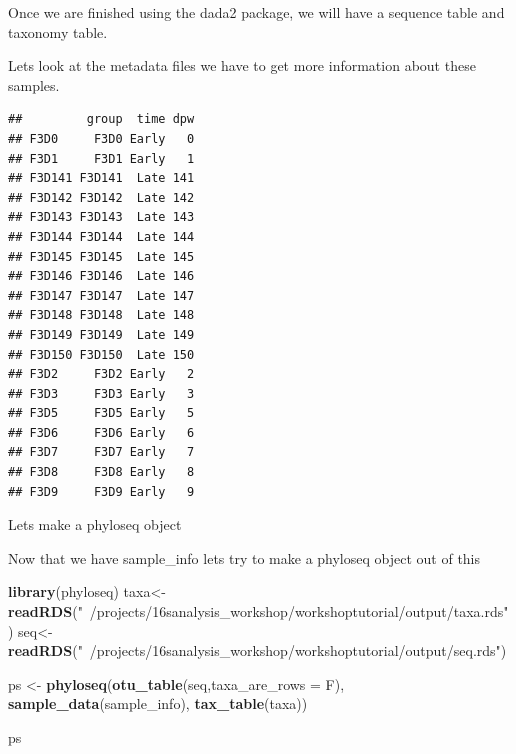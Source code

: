\documentclass[
]{book}
\newenvironment{Shaded}{\begin{snugshade}}{\end{snugshade}}
\newcommand{\CharTok}[1]{\textcolor[rgb]{0.31,0.60,0.02}{#1}}
\newcommand{\DataTypeTok}[1]{\textcolor[rgb]{0.13,0.29,0.53}{#1}}
\newcommand{\KeywordTok}[1]{\textcolor[rgb]{0.13,0.29,0.53}{\textbf{#1}}}
\newcommand{\NormalTok}[1]{#1}
\newcommand{\OperatorTok}[1]{\textcolor[rgb]{0.81,0.36,0.00}{\textbf{#1}}}
\newcommand{\StringTok}[1]{\textcolor[rgb]{0.31,0.60,0.02}{#1}}
\begin{document}
Once we are finished using the dada2 package, we will have a sequence table and taxonomy table.

Lets look at the metadata files we have to get more information about these samples.

\begin{Shaded}
\end{Shaded}

\begin{verbatim}
##         group  time dpw
## F3D0     F3D0 Early   0
## F3D1     F3D1 Early   1
## F3D141 F3D141  Late 141
## F3D142 F3D142  Late 142
## F3D143 F3D143  Late 143
## F3D144 F3D144  Late 144
## F3D145 F3D145  Late 145
## F3D146 F3D146  Late 146
## F3D147 F3D147  Late 147
## F3D148 F3D148  Late 148
## F3D149 F3D149  Late 149
## F3D150 F3D150  Late 150
## F3D2     F3D2 Early   2
## F3D3     F3D3 Early   3
## F3D5     F3D5 Early   5
## F3D6     F3D6 Early   6
## F3D7     F3D7 Early   7
## F3D8     F3D8 Early   8
## F3D9     F3D9 Early   9
\end{verbatim}

Lets make a phyloseq object

Now that we have sample\_info lets try to make a phyloseq object out of this

\begin{Shaded}
\begin{Highlighting}[]
\KeywordTok{library}\NormalTok{(phyloseq)}
\NormalTok{taxa<-}\KeywordTok{readRDS}\NormalTok{(}\StringTok{"~/projects/16sanalysis_workshop/workshoptutorial/output/taxa.rds"}\NormalTok{)}
\NormalTok{seq<-}\KeywordTok{readRDS}\NormalTok{(}\StringTok{"~/projects/16sanalysis_workshop/workshoptutorial/output/seq.rds"}\NormalTok{)}

\NormalTok{ps <-}\StringTok{ }\KeywordTok{phyloseq}\NormalTok{(}\KeywordTok{otu_table}\NormalTok{(seq,}\DataTypeTok{taxa_are_rows =}\NormalTok{ F),}
               \KeywordTok{sample_data}\NormalTok{(sample_info),}
               \KeywordTok{tax_table}\NormalTok{(taxa))}

\NormalTok{ps}
\end{Highlighting}
\end{Shaded}
\end{document}
